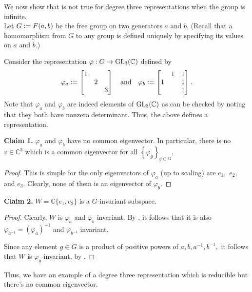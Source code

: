 \begin{ex} \label{ex:deg3repredbutnocommoneigen}
	We now show that  is not true for degree three representations when the group is infinite. \\
	Let $G \vcentcolon= F(a, b)$ be the free group on two generators $a$ and $b.$ (Recall that a homomorphism from $G$ to any group is defined uniquely by specifying its values on $a$ and $b.$)

	Consider the representation $\varphi : G \to \operatorname{GL}_3(\mathbb{C})$ defined by
	\begin{equation*} 
		\varphi_a \vcentcolon= \begin{bmatrix}
			1 &   &  \\
			  & 2 &  \\
			  &   & 3
		\end{bmatrix} \quad\text{and}\quad \varphi_b \vcentcolon= \begin{bmatrix}
			  & 1 & 1\\
			1 &   & 1\\
			  &   & 1
		\end{bmatrix}.
	\end{equation*} 
	Note that $\varphi_a$ and $\varphi_b$ are indeed elements of $\operatorname{GL}_3(\mathbb{C})$ as can be checked by noting that they both have nonzero determinant. Thus, the above defines a representation.

	\textbf{Claim 1.} $\varphi_a$ and $\varphi_b$ have no common eigenvector. In particular, there is no $v \in \mathbb{C}^3$ which is a common eigenvector for all $\left\{\varphi_g\right\}_{g \in G}.$

	\begin{proof} 
		This is simple for the only eigenvectors of $\varphi_a$ (up to scaling) are $e_1,$ $e_2,$ and $e_3.$ Clearly, none of them is an eigenvector of $\varphi_b.$
	\end{proof}

	\textbf{Claim 2.} $W = \mathbb{C}\{e_1, e_2\}$ is a $G$-invariant subspace.
	\begin{proof} 
		Clearly, $W$ is $\varphi_a$ and $\varphi_b$-invariant. By , it follows that it is also $\varphi_{a^{-1}} = \left(\varphi_a\right)^{-1}$ and $\varphi_{b^{-1}}$ invariant.

		Since any element $g \in G$ is a product of positive powers of $a, b, a^{-1}, b^{-1},$ it follows that $W$ is $\varphi_g$-invariant, by .
	\end{proof}

	Thus, we have an example of a degree three representation which is reducible but there's no common eigenvector.
\end{ex}

